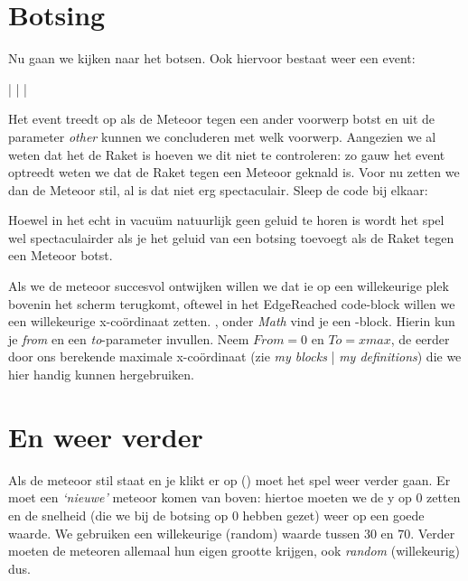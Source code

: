 \runOpTelefoon{}


\section{Botsing}	
Nu gaan we kijken naar het botsen. Ook hiervoor  bestaat weer een event:

    |  |  | 
	\linebreak {} 

Het event treedt op als de Meteoor tegen een ander voorwerp botst en uit de parameter \emph{other} kunnen we concluderen met welk voorwerp. Aangezien we al weten dat het de Raket is hoeven we dit niet te controleren: zo gauw het event optreedt weten we dat de Raket tegen een Meteoor geknald is. Voor nu zetten we dan de Meteoor stil, al is dat niet erg spectaculair. Sleep de code bij elkaar:


\runOpTelefoon{}
\begin{opgave}
   \opgVraag
	Hoewel in het echt in vacu\"um natuurlijk geen geluid te horen is wordt het spel wel spectaculairder als je het geluid van een botsing toevoegt als de Raket tegen een Meteoor botst. 
\end{opgave}

Als we de meteoor succesvol ontwijken willen we dat ie op een willekeurige plek bovenin het scherm terugkomt, oftewel in het EdgeReached code-block willen we een willekeurige x-co\"ordinaat zetten.  , onder \emph{Math} vind je een -block. Hierin kun je \emph{from} en een \emph{to}-parameter invullen. Neem $ From=0 $ en $ To=xmax $, de eerder door ons berekende maximale x-co\"ordinaat (zie \emph{my blocks} | \emph{my definitions}) die we hier handig kunnen hergebruiken. 



\section{En weer verder}
Als \runOpTelefoon{}de meteoor stil staat en je klikt er op () moet het spel weer verder gaan. Er moet een \emph{`nieuwe'} meteoor komen van boven: hiertoe moeten we de y op $0$ zetten en de snelheid (die we bij de botsing op $0$  hebben gezet) weer op een goede waarde. We gebruiken een willekeurige (random) waarde tussen $30$ en $70$. Verder moeten de meteoren allemaal hun eigen grootte krijgen, ook \emph{random} (willekeurig) dus.

